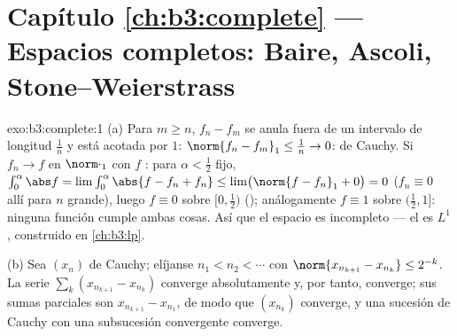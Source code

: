 \section*{Capítulo \ref{ch:b3:complete} --- Espacios completos:
Baire, Ascoli, Stone--Weierstrass}

\begin{solution}{exo:b3:complete:1}
(a) Para $m \geq n$, $f_n - f_m$ se anula fuera de un intervalo de
longitud $\frac1n$ y está acotada por $1$: $\norm{f_n - f_m}_1
\leq \frac1n \to 0$: de Cauchy. Si $f_n \to f$ en $\norm\cdot_1$ con $f$
: para $\alpha <
\frac12$ fijo, $\int_0^{\alpha}\abs f = \lim \int_0^\alpha\abs{f -
f_n + f_n} \leq \lim\bigl(\norm{f - f_n}_1 + 0\bigr) = 0$
($f_n \equiv 0$ allí para $n$ grande), luego $f \equiv 0$ sobre
$[0, \frac12)$ ();
análogamente $f \equiv 1$ sobre $(\frac12, 1]$: ninguna función
 cumple ambas cosas. Así
que el espacio es incompleto --- el
 es $L^1$, construido en
\cref{ch:b3:lp}.

(b) Sea $(x_n)$ de Cauchy; elíjanse $n_1 < n_2 < \cdots$ con
$\norm{x_{n_{k+1}} - x_{n_k}} \leq 2^{-k}$. La serie
$\sum_k (x_{n_{k+1}} - x_{n_k})$ converge absolutamente y, por tanto,
converge; sus sumas parciales son $x_{n_{k+1}} - x_{n_1}$, de modo que
$(x_{n_k})$ converge, y una sucesión de Cauchy con una subsucesión
convergente converge.
\end{solution}


